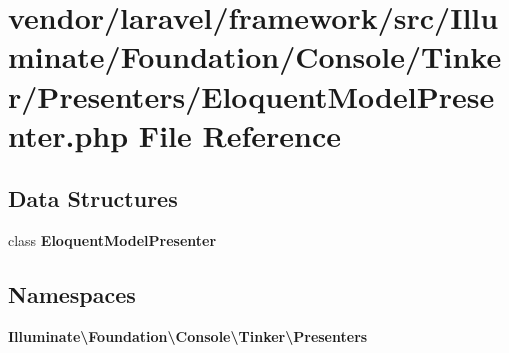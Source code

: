 \section{vendor/laravel/framework/src/\+Illuminate/\+Foundation/\+Console/\+Tinker/\+Presenters/\+Eloquent\+Model\+Presenter.php File Reference}
\label{_eloquent_model_presenter_8php}
\subsection*{Data Structures}
\begin{DoxyCompactItemize}
\item 
class {\bf Eloquent\+Model\+Presenter}
\end{DoxyCompactItemize}
\subsection*{Namespaces}
\begin{DoxyCompactItemize}
\item 
 {\bf Illuminate\textbackslash{}\+Foundation\textbackslash{}\+Console\textbackslash{}\+Tinker\textbackslash{}\+Presenters}
\end{DoxyCompactItemize}
